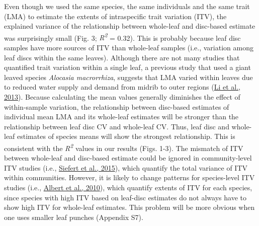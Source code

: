 \documentclass[
  12pt,
  a4paper,
,tablecaptionabove
]{scrartcl}
\begin{document}
Even though we used the same species, the same individuals and the same
trait (LMA) to estimate the extents of intraspecific trait variation
(ITV), the explained variance of the relationship between whole-leaf and
disc-based estimate was surprisingly small (Fig. 3;
\emph{R\textsuperscript{2}} = 0.32). This is probably because leaf disc
samples have more sources of ITV than whole-leaf samples (i.e.,
variation among leaf discs within the same leaves). Although there are
not many studies that quantified trait variation within a single leaf, a
previous study that used a giant leaved species \emph{Alocasia
macrorrhiza}, suggests that LMA varied within leaves due to reduced
water supply and demand from midrib to outer regions
(\protect\hyperlink{ref-Li2013a}{Li et al., 2013}). Because calculating
the mean values generally diminishes the effect of within-sample
variation, the relationship between disc-based estimates of individual
mean LMA and its whole-leaf estimates will be stronger than the
relationship between leaf disc CV and whole-leaf CV. Thus, leaf disc and
whole-leaf estimates of species means will show the strongest
relationship. This is consistent with the \emph{R\textsuperscript{2}}
values in our results (Figs. 1-3). The mismatch of ITV between
whole-leaf and disc-based estimate could be ignored in community-level
ITV studies (i.e., \protect\hyperlink{ref-Siefert2015}{Siefert et al.,
2015}), which quantify the total variance of ITV within communities.
However, it is likely to change patterns for species-level ITV studies
(i.e., \protect\hyperlink{ref-Albert2010a}{Albert et al., 2010}), which
quantify extents of ITV for each species, since species with high ITV
based on leaf-disc estimates do not always have to show high ITV for
whole-leaf estimates. This problem will be more obvious when one uses
smaller leaf punches (Appendix S7).
\end{document}
